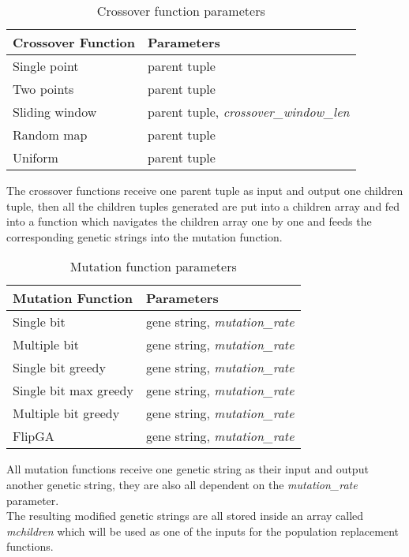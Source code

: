 \begin{table}[H]
\centering
\begin{tabular}{|l|l|} 
\hline
\rowcolor{Gray}
\textbf{Crossover Function} & \textbf{Parameters}          \\ 
\hline
Single point                & parent tuple                 \\ 
\hline
Two points                  & parent tuple                 \\ 
\hline
Sliding window              & parent tuple, \textit{crossover\_window\_len}  \\ 
\hline
Random map                  & parent tuple                 \\ 
\hline
Uniform                     & parent tuple                 \\
\hline
\end{tabular}
\caption{ Crossover function parameters}
\end{table}

The crossover functions receive one parent tuple as input and output one children tuple, then all the children tuples generated are put into a children array and fed into a function which navigates the children array one by one and feeds the corresponding genetic strings into the mutation function.

\begin{table}[H]
\centering
\begin{tabular}{|l|l|} 
\hline
\rowcolor{Gray}
\textbf{Mutation Function} & \textbf{Parameters}         \\ 
\hline
Single bit                 & gene string, \textit{mutation\_rate}  \\ 
\hline
Multiple bit               & gene string, \textit{mutation\_rate}  \\ 
\hline
Single bit greedy          & gene string, \textit{mutation\_rate}  \\ 
\hline
Single bit max greedy      & gene string, \textit{mutation\_rate}  \\ 
\hline
Multiple bit greedy        & gene string, \textit{mutation\_rate}  \\ 
\hline
FlipGA                     & gene string, \textit{mutation\_rate}  \\
\hline
\end{tabular}
\caption{ Mutation function parameters}
\end{table}
All mutation functions receive one genetic string as their input and output another genetic string, they are also all dependent on the \textit{mutation\_rate} parameter.
\\The resulting modified genetic strings are all stored inside an array called \textit{mchildren} which will be used as one of the inputs for the population replacement functions.

